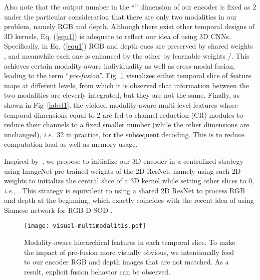 \documentclass[letterpaper]{article}
\def\ie{\emph{i.e.}}
\begin{document}
Also note that the output number in the ``'' dimension of our encoder is fixed as 2 under the particular consideration that there are only two modalities in our problem, namely RGB and depth. Although there exist other temporal designs of 3D kernels, Eq. (\ref{equ1}) is adequate to reflect our idea of using 3D CNNs. Specifically, in Eq. (\ref{equ1}) RGB and depth cues are preserved by shared weights , and meanwhile each one is enhanced by the other by learnable weights /. This achieves certain modality-aware individuality as well as cross-modal fusion, leading to the term ``\emph{pre-fusion}''. Fig. \ref{label3} visualizes either temporal slice of feature maps at different levels, from which it is observed that information between the two modalities are cleverly integrated, but they are not the same. Finally, as shown in Fig~\ref{label1}, the yielded modality-aware multi-level features whose temporal dimensions equal to 2 are fed to channel reduction (CR) modules to reduce their channels to a fixed smaller number (while the other dimensions are unchanged), \ie~32 in practice, for the subsequent decoding. This is to reduce computation load as well as memory usage.

Inspired by~\cite{carreira2017quo,feichtenhofer2016spatiotemporal,girdhar2018detect}, we propose to initialize our 3D encoder in a centralized strategy using ImageNet pre-trained weights of the 2D ResNet, namely using such 2D weights to initialize the central slice  of a 3D kernel while setting other slices to 0, \ie, . This strategy is equivalent to using a shared 2D ResNet to process RGB and depth at the beginning, which exactly coincides with the recent idea of using Siamese network for RGB-D SOD \cite{fu2020jl}.






\begin{figure}
	\centering
	\texttt{[image: visual-multimodalitis.pdf]}\vspace{-0.3cm}
	\caption{\small Modality-aware hierarchical features in each temporal slice. To make the impact of pre-fusion more visually obvious, we intentionally feed to our encoder RGB and depth images that are not matched. As a result, explicit fusion behavior can be observed.}\vspace{-0.3cm}
	\label{label3}
\end{figure}
\end{document}

